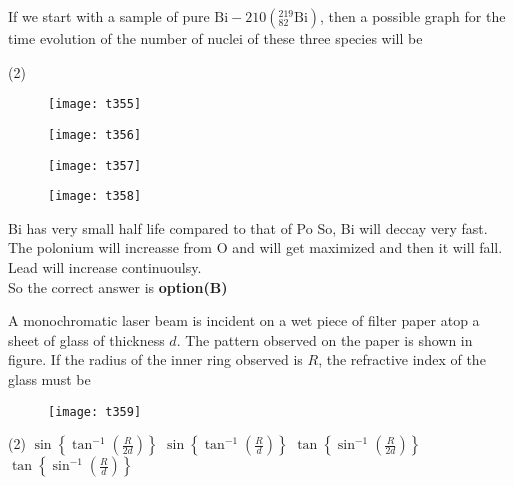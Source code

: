 \begin{questions}
\begin{minipage}{\textwidth}
	If we start with a sample of pure $\mathrm{Bi}-210\left({ }_{82}^{219} \mathrm{Bi}\right)$, then a possible graph for the time evolution of the number of nuclei of these three species will be
\end{minipage}
\begin{tasks}(2)
	\task[\textbf{A.}] \begin{figure}[H]
		\centering
		\texttt{[image: t355]}
	\end{figure}
	\task[\textbf{B.}] \begin{figure}[H]
		\centering
		\texttt{[image: t356]}
	\end{figure}
	\task[\textbf{C.}] \begin{figure}[H]
		\centering
		\texttt{[image: t357]}
	\end{figure}
	\task[\textbf{D.}] \begin{figure}[H]
		\centering
		\texttt{[image: t358]}
	\end{figure}
\end{tasks}
\begin{answer}
	Bi has very small half life compared to that of Po So, Bi will deccay very fast. The polonium will increasse from $\mathrm{O}$ and will get maximized and then it will fall. Lead will increase continuoulsy.\\
	So the correct answer is \textbf{option(B)}
\end{answer}
\begin{minipage}{\textwidth}
	\question A monochromatic laser beam is incident on a wet piece of filter paper atop a sheet of glass of thickness $d$. The pattern observed on the paper is shown in figure. If the radius of the inner ring observed is $R$, the refractive index of the glass must be
\end{minipage}
\begin{figure}[H]
	\centering
	\texttt{[image: t359]}
\end{figure}
\begin{tasks}(2)
	\task[\textbf{A.}] $\sin \left\{\tan ^{-1}\left(\frac{R}{2 d}\right)\right\}$
	\task[\textbf{B.}] $\sin \left\{\tan ^{-1}\left(\frac{R}{d}\right)\right\}$
	\task[\textbf{C.}] $\tan \left\{\sin ^{-1}\left(\frac{R}{2 d}\right)\right\}$
	\task[\textbf{D.}] $\tan \left\{\sin ^{-1}\left(\frac{R}{d}\right)\right\}$
\end{tasks}
\begin{answer}
	

\end{answer}
\end{questions}
